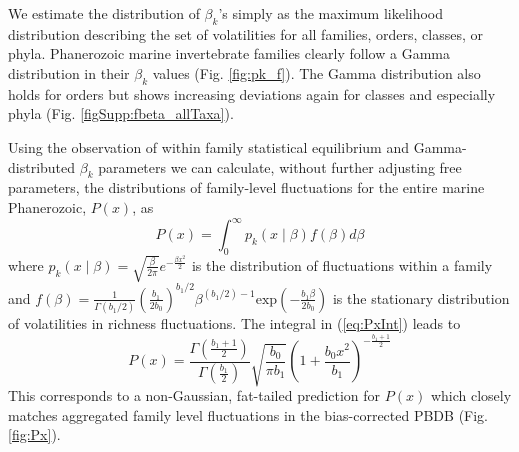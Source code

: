 \documentclass[12pt]{article}
\begin{document}
We estimate the distribution of $\beta_k$'s simply as the maximum
likelihood distribution describing the set of volatilities for all
families, orders, classes, or phyla. Phanerozoic marine invertebrate
families clearly follow a Gamma distribution in their $\beta_k$ values
(Fig. \ref{fig:pk_f}). The Gamma distribution also holds for orders but
shows increasing deviations again for classes and especially phyla
(Fig. \ref{figSupp:fbeta_allTaxa}).

Using the observation of within family statistical equilibrium and
Gamma-distributed $\beta_k$ parameters we can calculate, without
further adjusting free parameters, the distributions of family-level
fluctuations for the entire marine Phanerozoic, $P(x)$, as
\begin{equation}
  P(x) = \int_0^\infty p_k(x \mid \beta) f(\beta) d\beta \label{eq:PxInt}
\end{equation}
where
$p_k(x \mid \beta) = \sqrt{\frac{\beta}{2\pi}} e^{-\frac{\beta
    x^2}{2}}$ is the distribution of fluctuations within a family and
$f(\beta) = \frac{1}{\Gamma(b_1/2)}
\left(\frac{b_1}{2b_0}\right)^{b_1/2} \beta^{(b_1/2) - 1}
\text{exp}\left(-\frac{b_1 \beta}{2 b_0}\right)$ is the stationary
distribution of volatilities in richness fluctuations. The integral in
(\ref{eq:PxInt}) leads to
\begin{equation}
  \label{eq:Px}
  P(x) = \frac{\Gamma\left(\frac{b_1 +
        1}{2}\right)}{\Gamma\left(\frac{b_1}{2}\right)}
  \sqrt{\frac{b_0}{\pi b_1}} \left(1 + \frac{b_0
      x^2}{b_1}\right)^{-\frac{b_1 + 1}{2}}
\end{equation}
This corresponds to a non-Gaussian, fat-tailed prediction for $P(x)$
which closely matches aggregated family level fluctuations in the
bias-corrected PBDB (Fig. \ref{fig:Px}).
\end{document}
